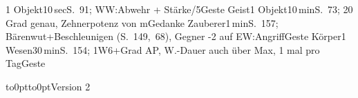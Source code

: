 \documentclass{m5figur-mv}[2016/01/04]
\begin{document}
{{{
}%



%
  {1 Objekt}{10\,sec}{S.~91; WW:Abwehr + Stärke/5}{Geste}
%
  {Geist}{1 Objekt}{10\,min}{S.~73; 20 Grad genau, Zehnerpotenz von m}{Gedanke}
%
  {Zauberer}{1\,min}{S.~157; Bärenwut+Beschleunigen (S.~149,~68),
  Gegner -2 auf EW:Angriff}{Geste}
%
  {Körper}{1 Wesen}{30\,min}{S.~154; 1W6+Grad AP, W.-Dauer auch über Max,
  1 mal pro Tag}{Geste}

\vbox to0pt{\vspace*{17cm}\hbox to0pt{\hspace*{2cm}Version 2}}




} %

}
\end{document}
